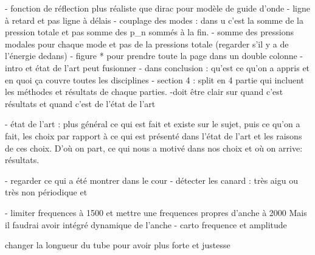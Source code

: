- fonction de réflection plus réaliste que dirac pour modèle de guide d'onde 
- ligne à retard et pas ligne à délais 
- couplage des modes : dans u c'est la somme de la pression totale et pas somme des p_n sommés à la fin. 
- somme des pressions modales pour chaque mode et pas de la pressions totale (regarder s'il y a de l'énergie dedans) 
- figure * pour prendre toute la page dans un double colonne
- intro et état de l'art peut fusionner 
- dans conclusion : qu'est ce qu'on a appris et en quoi ça couvre toutes les disciplines 
- section 4 : split en 4 partie qui incluent les méthodes et résultats de chaque parties. 
-doit être clair sur quand c'est résultats et quand c'est de l'état de l'art 

- état de l'art : plus général ce qui est fait et existe sur le sujet, puis ce qu'on a fait, les choix par rapport à ce qui est présenté dans l'état de l'art et les raisons de ces choix. D'où on part, ce qui nous a motivé dans nos choix et où on arrive: résultats. 

- regarder ce qui a été montrer dans le cour
- détecter les canard : très aigu ou très non périodique et 

- limiter frequences à 1500 et mettre une frequences propres d'anche à 2000 
Mais il faudrai avoir intégré dynamique de l'anche 
- carto frequence et amplitude 

changer la longueur du tube pour avoir plus forte et justesse 
